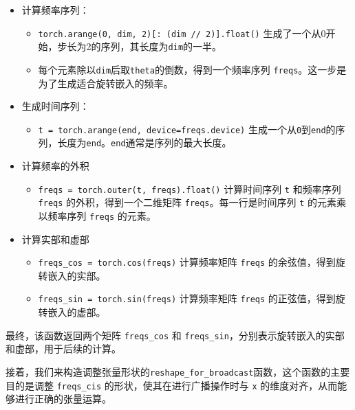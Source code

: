 \documentclass[
]{article}
\providecommand{\tightlist}{%
  \setlength{\itemsep}{0pt}\setlength{\parskip}{0pt}}
\begin{document}
\begin{itemize}
\tightlist
\item
  计算频率序列：

  \begin{itemize}
  \tightlist
  \item
    \texttt{torch.arange(0,\ dim,\ 2){[}:\ (dim\ //\ 2){]}.float()}
    生成了一个从0开始，步长为2的序列，其长度为\texttt{dim}的一半。
  \item
    每个元素除以\texttt{dim}后取\texttt{theta}的倒数，得到一个频率序列
    \texttt{freqs}。这一步是为了生成适合旋转嵌入的频率。
  \end{itemize}
\item
  生成时间序列：

  \begin{itemize}
  \tightlist
  \item
    \texttt{t\ =\ torch.arange(end,\ device=freqs.device)}
    生成一个从\texttt{0}到\texttt{end}的序列，长度为\texttt{end}。\texttt{end}通常是序列的最大长度。
  \end{itemize}
\item
  计算频率的外积

  \begin{itemize}
  \tightlist
  \item
    \texttt{freqs\ =\ torch.outer(t,\ freqs).float()} 计算时间序列
    \texttt{t} 和频率序列 \texttt{freqs} 的外积，得到一个二维矩阵
    \texttt{freqs}。每一行是时间序列 \texttt{t} 的元素乘以频率序列
    \texttt{freqs} 的元素。
  \end{itemize}
\item
  计算实部和虚部

  \begin{itemize}
  \tightlist
  \item
    \texttt{freqs\_cos\ =\ torch.cos(freqs)} 计算频率矩阵 \texttt{freqs}
    的余弦值，得到旋转嵌入的实部。
  \item
    \texttt{freqs\_sin\ =\ torch.sin(freqs)} 计算频率矩阵 \texttt{freqs}
    的正弦值，得到旋转嵌入的虚部。
  \end{itemize}
\end{itemize}

最终，该函数返回两个矩阵 \texttt{freqs\_cos} 和
\texttt{freqs\_sin}，分别表示旋转嵌入的实部和虚部，用于后续的计算。

接着，我们来构造调整张量形状的\texttt{reshape\_for\_broadcast}函数，这个函数的主要目的是调整
\texttt{freqs\_cis} 的形状，使其在进行广播操作时与 \texttt{x}
的维度对齐，从而能够进行正确的张量运算。
\end{document}
